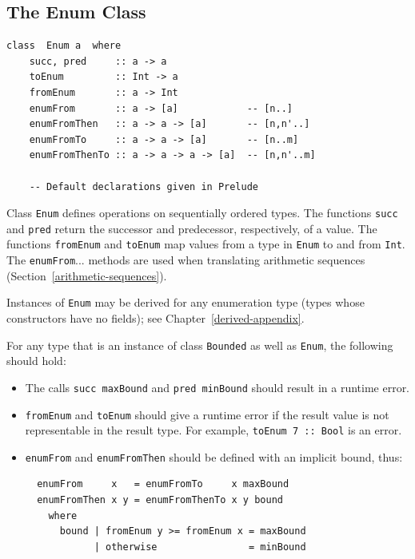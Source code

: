\subsection{The Enum Class}
\label{enum-class}
\bprog
{\small\begin{verbatim}
class  Enum a  where
    succ, pred     :: a -> a
    toEnum         :: Int -> a
    fromEnum       :: a -> Int
    enumFrom       :: a -> [a]            -- [n..]
    enumFromThen   :: a -> a -> [a]       -- [n,n'..]
    enumFromTo     :: a -> a -> [a]       -- [n..m]
    enumFromThenTo :: a -> a -> a -> [a]  -- [n,n'..m]

    -- Default declarations given in Prelude
\end{verbatim}}
\eprog
Class \mbox{\tt Enum} defines operations on sequentially ordered types.
The functions \mbox{\tt succ} and \mbox{\tt pred} return the successor and predecessor,
respectively, of a value.
The functions \mbox{\tt fromEnum} and \mbox{\tt toEnum} map values from a type in
\mbox{\tt Enum} to and from \mbox{\tt Int}.  
The \mbox{\tt enumFrom}... methods are used when translating arithmetic
sequences (Section~\ref{arithmetic-sequences}).

Instances of \mbox{\tt Enum} may be derived for any enumeration type (types
whose constructors have no fields); see Chapter~\ref{derived-appendix}.

For any type that is an instance of class \mbox{\tt Bounded} as well as \mbox{\tt Enum}, the following
should hold:
\begin{itemize}
\item The calls \mbox{\tt succ\ maxBound} and \mbox{\tt pred\ minBound} should result in
a runtime error.

\item \mbox{\tt fromEnum} and \mbox{\tt toEnum} should give a runtime error if the 
result value is not representable in the result type.  For example,
\mbox{\tt toEnum\ 7\ ::\ Bool} is an error.

\item \mbox{\tt enumFrom} and \mbox{\tt enumFromThen} should be defined with 
an implicit bound, thus:
\bprog
{\small\begin{verbatim}
  enumFrom     x   = enumFromTo     x maxBound
  enumFromThen x y = enumFromThenTo x y bound
    where
      bound | fromEnum y >= fromEnum x = maxBound
            | otherwise                = minBound
\end{verbatim}}
\eprog
\end{itemize}

